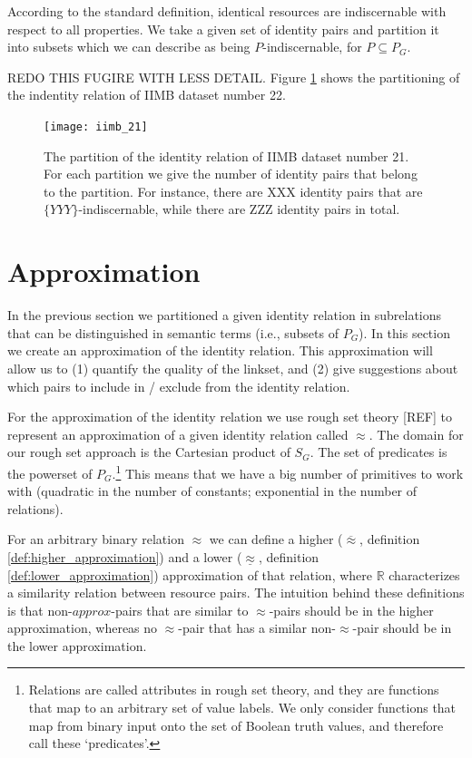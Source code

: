 \documentclass[letterpaper]{article}
\begin{document}
According to the standard definition, identical resources are indiscernable with respect to all properties. We take a given set of identity pairs and partition it into subsets which we can describe as being $P$-indiscernable, for $P \subseteq P_G$.

REDO THIS FUGIRE WITH LESS DETAIL.
Figure \ref{fig:indiscernability_iimb} shows the partitioning of the indentity relation of IIMB dataset number 22.

\begin{figure}
\label{fig:indiscernability_iimb}
\caption{The partition of the identity relation of IIMB dataset number 21. For each partition we give the number of identity pairs that belong to the partition. For instance, there are XXX identity pairs that are $\{ YYY \}$-indiscernable, while there are ZZZ identity pairs in total.}
\texttt{[image: iimb\_21]}
\end{figure}

\section{Approximation}
\label{sec:approximation}

In the previous section we partitioned a given identity relation in subrelations that can be distinguished in semantic terms (i.e., subsets of $P_G$). In this section we create an approximation of the identity relation. This approximation will allow us to (1) quantify the quality of the linkset, and (2) give suggestions about which pairs to include in / exclude from the identity relation.

For the approximation of the identity relation we use rough set theory [REF] to represent an approximation of a given identity relation called $\approx$. The domain for our rough set approach is the Cartesian product of $S_G$. The set of predicates is the powerset of $P_G$.\footnote{Relations are called attributes in rough set theory, and they are functions that map to an arbitrary set of value labels. We only consider functions that map from binary input onto the set of Boolean truth values, and therefore call these `predicates'.} This means that we have a big number of primitives to work with (quadratic in the number of constants; exponential in the number of relations).

For an arbitrary binary relation $\approx$ we can define a higher ($\overline{\approx}$, definition \ref{def:higher_approximation}) and a lower ($\underline{\approx}$, definition \ref{def:lower_approximation}) approximation of that relation, where $\mathbb{R}$ characterizes a similarity relation between resource pairs. The intuition behind these definitions is that non-$approx$-pairs that are similar to $\approx$-pairs should be in the higher approximation, whereas no $\approx$-pair that has a similar non-$\approx$-pair should be in the lower approximation.
\end{document}
